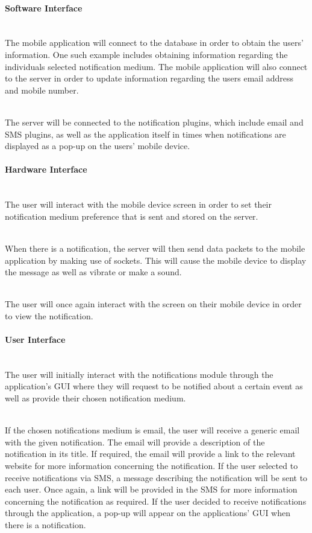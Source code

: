 \documentclass[runningheads,a4paper]{article}
\begin{document}
\paragraph{Software Interface}
\mbox{}\\
The mobile application will connect to the database in order to obtain the users’ information. One such example includes obtaining information regarding the individuals selected notification medium. The mobile application will also connect to the server in order to update information regarding the users email address and mobile number.

\mbox{}\\
The server will be connected to the notification plugins, which include email and SMS plugins, as well as the application itself in times when notifications are displayed as a pop-up on the users’ mobile device.



\paragraph{Hardware Interface}

\mbox{}\\
The user will interact with the mobile device screen in order to set their notification medium preference that is sent and stored on the server. 

\mbox{}\\
When there is a notification, the server will then send data packets to the mobile application by making use of sockets. This will cause the mobile device to display the message as well as vibrate or make a sound. 

\mbox{}\\
The user will once again interact with the screen on their mobile device in order to view the notification.

\paragraph{User Interface}
\mbox{}\\
The user will initially interact with the notifications module through the application’s GUI where they will request to be notified about a certain event as well as provide their chosen notification medium. 

\mbox{}\\
If the chosen notifications medium is email, the user will receive a generic email with the given notification. The email will provide a description of the notification in its title. If required, the email will provide a link to the relevant website for more information concerning the notification. If the user selected to receive notifications via SMS, a message describing the notification will be sent to each user. Once again, a link will be provided in the SMS for more information concerning the notification as required. If the user decided to receive notifications through the application, a pop-up will appear on the applications’ GUI when there is a notification. 
\end{document}
